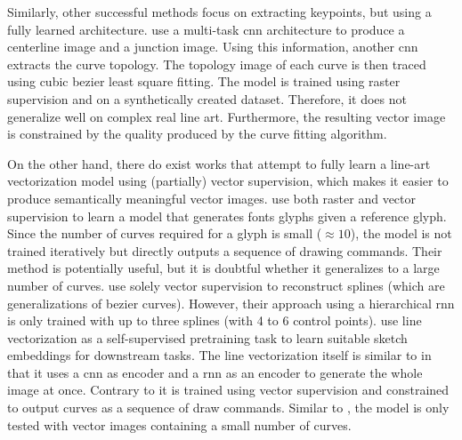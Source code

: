 Similarly, other successful methods focus on extracting keypoints, but using a fully learned architecture. \citet{DBLP:journals/cgf/GuoZHHLW19} use a multi-task \gls{cnn} architecture to produce a centerline image and a junction image. Using this information, another \gls{cnn} extracts the curve topology. The topology image of each curve is then traced using cubic bezier least square fitting. The model is trained using raster supervision and on a synthetically created dataset. Therefore, it does not generalize well on complex real line art. Furthermore, the resulting vector image is constrained by the quality produced by the curve fitting algorithm.

On the other hand, there do exist works that attempt to fully learn a line-art vectorization model using (partially) vector supervision, which makes it easier to produce semantically meaningful vector images. \citet{DBLP:journals/tog/WangL21} use both raster and vector supervision to learn a model that generates fonts glyphs given a reference glyph. Since the number of curves required for a glyph is small ($\approx10$), the model is not trained iteratively but directly outputs a sequence of drawing commands. Their method is potentially useful, but it is doubtful whether it generalizes to a large number of curves. \citet{DBLP:journals/corr/abs-1901-03781} use solely vector supervision to reconstruct splines (which are generalizations of bezier curves). However, their approach using a hierarchical \gls{rnn} is only trained with up to three splines (with 4 to 6 control points). \citet{DBLP:conf/cvpr/BhuniaCYHXS21} use line vectorization as a self-supervised pretraining task to learn suitable sketch embeddings for downstream tasks. The line vectorization itself is similar to \citet{DBLP:conf/cvpr/Reddy21} in that it uses a \gls{cnn} as encoder and a \gls{rnn} as an encoder to generate the whole image at once. Contrary to \citet{DBLP:conf/cvpr/Reddy21} it is trained using vector supervision and constrained to output curves as a sequence of draw commands. Similar to \citet{DBLP:conf/cvpr/Reddy21}, the model is only tested with vector images containing a small number of curves.


